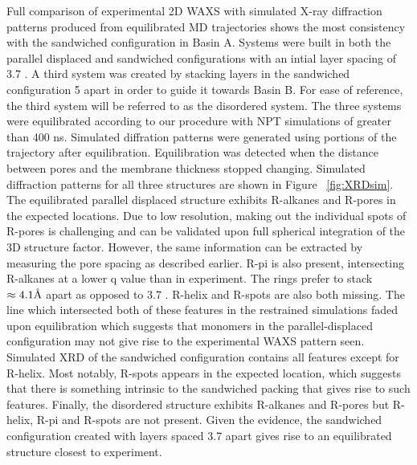 Full comparison of experimental 2D WAXS with simulated X-ray diffraction
patterns produced from equilibrated MD trajectories shows the most consistency
with the sandwiched configuration in Basin A. Systems were built in both the 
parallel displaced and sandwiched configurations with an intial layer spacing of
3.7 \angstrom. A third system was created by stacking layers in the sandwiched 
configuration 5 \angstrom apart in order to guide it towards Basin B. For ease of
reference, the third system will be referred to as the disordered system. The 
three systems were equilibrated according to our procedure with NPT simulations of 
greater than 400 ns. Simulated diffration patterns were generated using 
portions of the trajectory after equilibration. Equilibration was detected
when the distance between pores and the membrane thickness stopped changing.
Simulated diffraction patterns for all three structures are shown in 
Figure ~\ref{fig:XRDsim}. The equilibrated parallel displaced structure exhibits 
R-alkanes and R-pores in the expected locations. Due to low resolution, making
out the individual spots of R-pores is challenging and can be validated upon
full spherical integration of the 3D structure factor. However, the same information
can be extracted by measuring the pore spacing as described earlier. R-pi is
also present, intersecting R-alkanes at a lower q value than in experiment.
The rings prefer to stack $\approx 4.1 \textup{\AA}$ apart as opposed to 3.7 \angstrom.
R-helix and R-spots are also both missing. The line which intersected both of these
features in the restrained simulations faded upon equilibration which suggests
that monomers in the parallel-displaced configuration may not give rise to the 
experimental WAXS pattern seen. Simulated XRD of the sandwiched configuration 
contains all features except for R-helix. Most notably, R-spots appears in the
expected location, which suggests that there is something intrinsic to
the sandwiched packing that gives rise to such features. Finally, the 
disordered structure exhibits R-alkanes and R-pores but R-helix, R-pi and R-spots are not
present. Given the evidence, the sandwiched configuration created with layers spaced
3.7 \angstrom apart gives rise to an equilibrated structure closest to experiment. 

